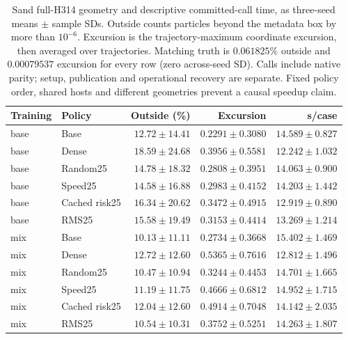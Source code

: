 \begin{table}[t]
\centering\scriptsize
\caption{Sand full-H314 geometry and descriptive committed-call time, as three-seed means $\pm$ sample SDs. Outside counts particles beyond the metadata box by more than $10^{-6}$. Excursion is the trajectory-maximum coordinate excursion, then averaged over trajectories. Matching truth is $0.061825\%$ outside and $0.00079537$ excursion for every row (zero across-seed SD). Calls include native parity; setup, publication and operational recovery are separate. Fixed policy order, shared hosts and different geometries prevent a causal speedup claim.}
\label{tab:sand-all-cost}
\setlength{\tabcolsep}{3pt}
\begin{tabular}{llrrr}
\toprule
Training & Policy & Outside (\%) & Excursion & s/case\\
\midrule
base & Base & $12.72\pm14.41$ & $0.2291\pm0.3080$ & $14.589\pm0.827$\\
base & Dense & $18.59\pm24.68$ & $0.3956\pm0.5581$ & $12.242\pm1.032$\\
base & Random25 & $14.78\pm18.32$ & $0.2808\pm0.3951$ & $14.063\pm0.900$\\
base & Speed25 & $14.58\pm16.88$ & $0.2983\pm0.4152$ & $14.203\pm1.442$\\
base & Cached risk25 & $16.34\pm20.62$ & $0.3472\pm0.4915$ & $12.919\pm0.890$\\
base & RMS25 & $15.58\pm19.49$ & $0.3153\pm0.4414$ & $13.269\pm1.214$\\
mix & Base & $10.13\pm11.11$ & $0.2734\pm0.3668$ & $15.402\pm1.469$\\
mix & Dense & $12.72\pm12.60$ & $0.5365\pm0.7616$ & $12.812\pm1.496$\\
mix & Random25 & $10.47\pm10.94$ & $0.3244\pm0.4453$ & $14.701\pm1.665$\\
mix & Speed25 & $11.19\pm11.75$ & $0.4666\pm0.6812$ & $14.952\pm1.715$\\
mix & Cached risk25 & $12.04\pm12.60$ & $0.4914\pm0.7048$ & $14.142\pm2.035$\\
mix & RMS25 & $10.54\pm10.31$ & $0.3752\pm0.5251$ & $14.263\pm1.807$\\
\bottomrule
\end{tabular}
\end{table}

